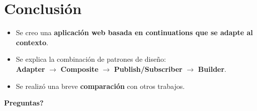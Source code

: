 \documentclass[
paper=128mm:96mm, %
fontsize=11pt, %
pagesize, %
parskip=half-, %
]{scrartcl} %
\theoremstyle{mythmstyle} %
\begin{document}
\clearpage


\section{Conclusión}

\begin{itemize}
\item Se creo una \textbf{aplicación web basada en continuations que se adapte al contexto}.
\item Se explica la combinación de patrones de diseño: \\ \textbf{Adapter} $\rightarrow$ \textbf{Composite} $\rightarrow$ \textbf{Publish/Subscriber} $\rightarrow$ \textbf{Builder}.
\item Se realizó una breve \textbf{comparación} con otros trabajos.
\end{itemize}

\clearpage












\clearpage


\thispagestyle{empty} %

\begin{flushright}
\vspace{0.6cm}
\color{white}\sffamily
{\bfseries\LARGE Preguntas?\par} %
\vfill
\end{flushright}

\end{document}
